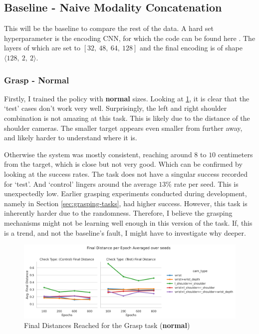 \subsection{Baseline - Naive Modality Concatenation}
This will be the baseline to compare the rest of the data. A hard set hyperparameter is the encoding CNN, for which the code can be found here . The layers of which are set to $\left[32, ~48, ~64, ~128\right]$ and the final encoding is of shape \(\langle 128, ~2, ~2 \rangle\).

\subsubsection{Grasp - Normal}
Firstly, I trained the policy with \textbf{normal} sizes. Looking at \ref{fig:base-grasp-final-normal}, it is clear that the `test' cases don't work very well. Surprisingly, the left and right shoulder combination is not amazing at this task. This is likely due to the distance of the shoulder cameras. The smaller target appears even smaller from further away, and likely harder to understand where it is. 

Otherwise the system was mostly consistent, reaching around $8$ to $10$ centimeters from the target, which is close but not very good. Which can be confirmed by looking at the success rates. The task does not have a singular success recorded for `test'. And `control' lingers around the average $13$\% rate per seed. This is unexpectedly low. Earlier grasping experiments conducted during development, namely in Section \ref{sec:grasping-tasks}, had higher success. However, this task is inherently harder due to the randomness. Therefore, I believe the grasping mechanisms might not be learning well enough in this version of the task. If, this is a trend, and not the baseline's fault, I might have to investigate why deeper.

\begin{figure}[htpb]
  \centering
  \includegraphics[width=\linewidth]{assets/evaluation/baseline/base-grasp-final.png}
  \caption{Final Distances Reached for the Grasp task (\textbf{normal})}\label{fig:base-grasp-final-normal}
\end{figure}

